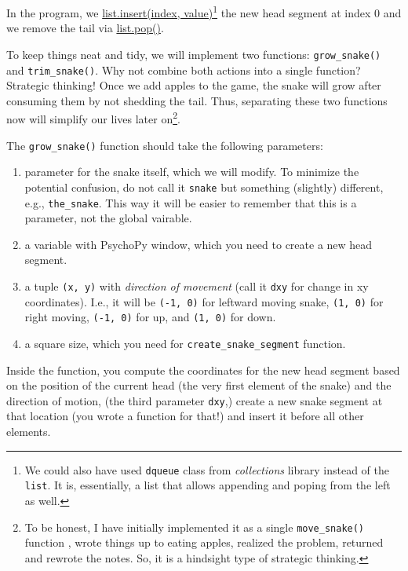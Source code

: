 \documentclass[
]{book}
\providecommand{\tightlist}{%
  \setlength{\itemsep}{0pt}\setlength{\parskip}{0pt}}
\begin{document}
In the program, we \href{https://docs.python.org/3/tutorial/datastructures.html\#more-on-lists}{list.insert(index, value)}\footnote{We could also have used \texttt{dqueue} class from \emph{collections} library instead of the \texttt{list}. It is, essentially, a list that allows appending and poping from the left as well.} the new head segment at index 0 and we remove the tail via \href{https://docs.python.org/3/tutorial/datastructures.html\#more-on-lists}{list.pop()}.

To keep things neat and tidy, we will implement two functions: \texttt{grow\_snake()} and \texttt{trim\_snake()}. Why not combine both actions into a single function? Strategic thinking! Once we add apples to the game, the snake will grow after consuming them by not shedding the tail. Thus, separating these two functions now will simplify our lives later on\footnote{To be honest, I have initially implemented it as a single \texttt{move\_snake()} function , wrote things up to eating apples, realized the problem, returned and rewrote the notes. So, it is a hindsight type of strategic thinking.}.

The \texttt{grow\_snake()} function should take the following parameters:

\begin{enumerate}
\def\labelenumi{\arabic{enumi}.}
\tightlist
\item
  parameter for the snake itself, which we will modify. To minimize the potential confusion, do not call it \texttt{snake} but something (slightly) different, e.g., \texttt{the\_snake}. This way it will be easier to remember that this is a parameter, not the global vairable.
\item
  a variable with PsychoPy window, which you need to create a new head segment.
\item
  a tuple \texttt{(x,\ y)} with \emph{direction of movement} (call it \texttt{dxy} for change in xy coordinates). I.e., it will be \texttt{(-1,\ 0)} for leftward moving snake, \texttt{(1,\ 0)} for right moving, \texttt{(-1,\ 0)} for up, and \texttt{(1,\ 0)} for down.
\item
  a square size, which you need for \texttt{create\_snake\_segment} function.
\end{enumerate}

Inside the function, you compute the coordinates for the new head segment based on the position of the current head (the very first element of the snake) and the direction of motion, (the third parameter \texttt{dxy},) create a new snake segment at that location (you wrote a function for that!) and insert it before all other elements.
\end{document}
